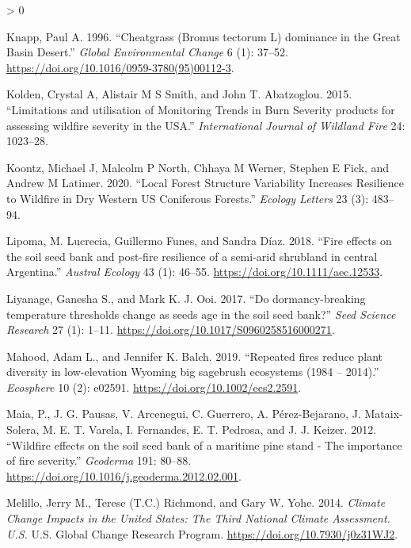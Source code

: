 \documentclass[
  12pt,
]{article}
\newlength{\cslhangindent}
\newenvironment{CSLReferences}[2] %
 {%
  \setlength{\parindent}{0pt}
  \ifodd #1 \everypar{\setlength{\hangindent}{\cslhangindent}}\ignorespaces\fi
  \ifnum #2 > 0
  \setlength{\parskip}{#2\baselineskip}
  \fi
 }%
 {}
\begin{document}
\begin{CSLReferences}{1}{0}
\leavevmode\hypertarget{ref-Knapp1996}{}%
Knapp, Paul A. 1996. {``{Cheatgrass (Bromus tectorum L) dominance in the
Great Basin Desert}.''} \emph{Global Environmental Change} 6 (1):
37--52. \url{https://doi.org/10.1016/0959-3780(95)00112-3}.

\leavevmode\hypertarget{ref-Kolden2015}{}%
Kolden, Crystal A, Alistair M S Smith, and John T. Abatzoglou. 2015.
{``{Limitations and utilisation of Monitoring Trends in Burn Severity
products for assessing wildfire severity in the USA}.''}
\emph{International Journal of Wildland Fire} 24: 1023--28.

\leavevmode\hypertarget{ref-Koontz2020}{}%
Koontz, Michael J, Malcolm P North, Chhaya M Werner, Stephen E Fick, and
Andrew M Latimer. 2020. {``Local Forest Structure Variability Increases
Resilience to Wildfire in Dry Western US Coniferous Forests.''}
\emph{Ecology Letters} 23 (3): 483--94.

\leavevmode\hypertarget{ref-Lipoma2018}{}%
Lipoma, M. Lucrecia, Guillermo Funes, and Sandra Díaz. 2018. {``{Fire
effects on the soil seed bank and post-fire resilience of a semi-arid
shrubland in central Argentina}.''} \emph{Austral Ecology} 43 (1):
46--55. \url{https://doi.org/10.1111/aec.12533}.

\leavevmode\hypertarget{ref-Liyanage2017}{}%
Liyanage, Ganesha S., and Mark K. J. Ooi. 2017. {``{Do dormancy-breaking
temperature thresholds change as seeds age in the soil seed bank?}''}
\emph{Seed Science Research} 27 (1): 1--11.
\url{https://doi.org/10.1017/S0960258516000271}.

\leavevmode\hypertarget{ref-Mahood2019}{}%
Mahood, Adam L., and Jennifer K. Balch. 2019. {``{Repeated fires reduce
plant diversity in low-elevation Wyoming big sagebrush ecosystems (1984
-- 2014)}.''} \emph{Ecosphere} 10 (2): e02591.
\url{https://doi.org/10.1002/ecs2.2591}.

\leavevmode\hypertarget{ref-Maia2012}{}%
Maia, P., J. G. Pausas, V. Arcenegui, C. Guerrero, A. Pérez-Bejarano, J.
Mataix-Solera, M. E. T. Varela, I. Fernandes, E. T. Pedrosa, and J. J.
Keizer. 2012. {``{Wildfire effects on the soil seed bank of a maritime
pine stand - The importance of fire severity}.''} \emph{Geoderma} 191:
80--88. \url{https://doi.org/10.1016/j.geoderma.2012.02.001}.

\leavevmode\hypertarget{ref-Melillo2014}{}%
Melillo, Jerry M., Terese (T.C.) Richmond, and Gary W. Yohe. 2014.
\emph{Climate {Change} {Impacts} in the {United} {States}: {The} {Third}
{National} {Climate} {Assessment}. {U}.{S}.} U.S. Global Change Research
Program. \url{https://doi.org/10.7930/j0z31WJ2}.


\end{CSLReferences}
\end{document}
